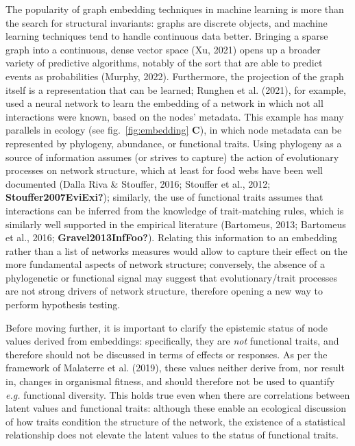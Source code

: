 \documentclass[10pt,oneside]{article}
\begin{document}
The popularity of graph embedding techniques in machine learning is more
than the search for structural invariants: graphs are discrete objects,
and machine learning techniques tend to handle continuous data better.
Bringing a sparse graph into a continuous, dense vector space (Xu, 2021)
opens up a broader variety of predictive algorithms, notably of the sort
that are able to predict events as probabilities (Murphy, 2022).
Furthermore, the projection of the graph itself is a representation that
can be learned; Runghen et al. (2021), for example, used a neural
network to learn the embedding of a network in which not all
interactions were known, based on the nodes' metadata. This example has
many parallels in ecology (see fig.~\ref{fig:embedding} \textbf{C}), in
which node metadata can be represented by phylogeny, abundance, or
functional traits. Using phylogeny as a source of information assumes
(or strives to capture) the action of evolutionary processes on network
structure, which at least for food webs have been well documented (Dalla
Riva \& Stouffer, 2016; Stouffer et al., 2012;
\textbf{Stouffer2007EviExi?}); similarly, the use of functional traits
assumes that interactions can be inferred from the knowledge of
trait-matching rules, which is similarly well supported in the empirical
literature (Bartomeus, 2013; Bartomeus et al., 2016;
\textbf{Gravel2013InfFoo?}). Relating this information to an embedding
rather than a list of networks measures would allow to capture their
effect on the more fundamental aspects of network structure; conversely,
the absence of a phylogenetic or functional signal may suggest that
evolutionary/trait processes are not strong drivers of network
structure, therefore opening a new way to perform hypothesis testing.

Before moving further, it is important to clarify the epistemic status
of node values derived from embeddings: specifically, they are
\emph{not} functional traits, and therefore should not be discussed in
terms of effects or responses. As per the framework of Malaterre et al.
(2019), these values neither derive from, nor result in, changes in
organismal fitness, and should therefore not be used to quantify
\emph{e.g.} functional diversity. This holds true even when there are
correlations between latent values and functional traits: although these
enable an ecological discussion of how traits condition the structure of
the network, the existence of a statistical relationship does not
elevate the latent values to the status of functional traits.
\end{document}
